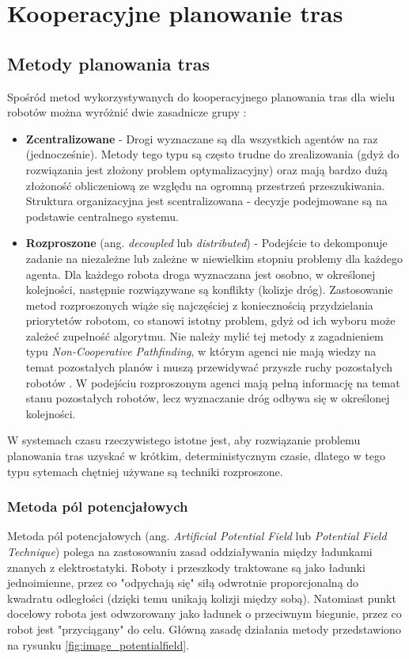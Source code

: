 \chapter{Kooperacyjne planowanie tras}
\label{ch:cooperative_pathfinding}

\section{Metody planowania tras}
Spośród metod wykorzystywanych do kooperacyjnego planowania tras dla wielu robotów można wyróżnić dwie zasadnicze grupy \cite{latombe}:
\begin{itemize}
	\item {\bf Zcentralizowane} - Drogi wyznaczane są dla wszystkich agentów na raz (jednocześnie). Metody tego typu są często trudne do zrealizowania (gdyż do rozwiązania jest złożony problem optymalizacyjny) oraz mają bardzo dużą złożoność obliczeniową ze względu na ogromną przestrzeń przeszukiwania. Struktura organizacyjna jest scentralizowana - decyzje podejmowane są na podstawie centralnego systemu.
	\item {\bf Rozproszone} (ang. {\it decoupled} lub {\it distributed}) - Podejście to dekomponuje zadanie na niezależne lub zależne w niewielkim stopniu problemy dla każdego agenta. Dla każdego robota droga wyznaczana jest osobno, w określonej kolejności, następnie rozwiązywane są konflikty (kolizje dróg).
	Zastosowanie metod rozproszonych wiąże się najczęściej z koniecznością przydzielania priorytetów robotom, co stanowi istotny problem, gdyż od ich wyboru może zależeć zupełność algorytmu. Nie należy mylić tej metody z zagadnieniem typu {\it Non-Cooperative Pathfinding}, w którym agenci nie mają wiedzy na temat pozostałych planów i muszą przewidywać przyszłe ruchy pozostałych robotów \cite{cooppath}. W podejściu rozproszonym agenci mają pełną informację na temat stanu pozostałych robotów, lecz wyznaczanie dróg odbywa się w określonej kolejności.
\end{itemize}

W systemach czasu rzeczywistego istotne jest, aby rozwiązanie problemu planowania tras uzyskać w krótkim, deterministycznym czasie, dlatego w tego typu sytemach chętniej używane są techniki rozproszone.

\subsection{Metoda pól potencjałowych}
Metoda pól potencjałowych (ang. {\it Artificial Potential Field} lub {\it Potential Field Technique}) polega na zastosowaniu zasad oddziaływania między ładunkami znanych z elektrostatyki. Roboty i przeszkody traktowane są jako ładunki jednoimienne, przez co "odpychają się" siłą odwrotnie proporcjonalną do kwadratu odległości (dzięki temu unikają kolizji między sobą). Natomiast punkt docelowy robota jest odwzorowany jako ładunek o przeciwnym biegunie, przez co robot jest "przyciągany" do celu.
Główną zasadę działania metody przedstawiono na rysunku \ref{fig:image_potentialfield}.


